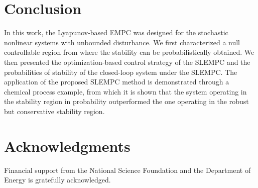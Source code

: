 \documentclass[letterpaper, 10pt, conference]{ieeeconf}
\begin{document}
\section{Conclusion}
In this work, the Lyapunov-based EMPC was designed for the stochastic nonlinear systems with unbounded disturbance. We first characterized a null controllable region from where the stability can be probabilistically obtained. We then presented the optimization-based control strategy of the SLEMPC and the probabilities of stability of the closed-loop system under the SLEMPC. The application of the proposed SLEMPC method is demonstrated through a chemical process example, from which it is shown that the system operating in the stability region in probability outperformed the one operating in the robust but conservative stability region.




\section{Acknowledgments}
Financial support from the National Science Foundation and the Department of Energy is gratefully acknowledged.



%

\end{document}
